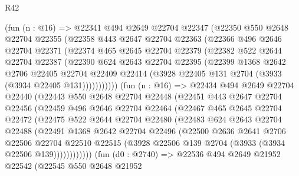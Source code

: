 \begin{lexlean}{R42}
\begin{coremodule}
        (fun (n : @16) =>
        @22341
          @494
          @2649
          @22704
          @22347
          (@22350
            @550
            @2648
            @22704
            @22355
            (@22358
              @443
              @2647
              @22704
              @22363
              (@22366
                @496
                @2646
                @22704
                @22371
                (@22374
                  @465
                  @2645
                  @22704
                  @22379
                  (@22382
                    @522
                    @2644
                    @22704
                    @22387
                    (@22390
                      @624
                      @2643
                      @22704
                      @22395
                      (@22399
                        @1368
                        @2642
                        @2706
                        @22405
                        @22704
                        @22409
                        @22414
                        (@3928 @22405 @131 @2704 (@3933 (@3934 @22405 @131)))))))))))
        (fun (n : @16) =>
        @22434
          @494
          @2649
          @22704
          @22440
          (@22443
            @550
            @2648
            @22704
            @22448
            (@22451
              @443
              @2647
              @22704
              @22456
              (@22459
                @496
                @2646
                @22704
                @22464
                (@22467
                  @465
                  @2645
                  @22704
                  @22472
                  (@22475
                    @522
                    @2644
                    @22704
                    @22480
                    (@22483
                      @624
                      @2643
                      @22704
                      @22488
                      (@22491
                        @1368
                        @2642
                        @22704
                        @22496
                        (@22500
                          @2636
                          @2641
                          @2706
                          @22506
                          @22704
                          @22510
                          @22515
                          (@3928 @22506 @139 @2704 (@3933 (@3934 @22506 @139))))))))))))
        (fun (d0 : @2740) =>
        @22536
          @494
          @2649
          @21952
          @22542
          (@22545
            @550
            @2648
            @21952

\end{coremodule}
\end{lexlean}
